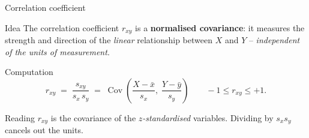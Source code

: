 \documentclass[aspectratio=169,11pt]{beamer}
\begin{document}
\begin{frame}{Correlation coefficient}
  \begin{block}{Idea}
    The correlation coefficient $r_{xy}$ is a
    \textbf{normalised covariance}: it measures the strength and
    direction of the \emph{linear} relationship between $X$ and $Y$
    -- \emph{independent of the units of measurement}.
  \end{block}

  \begin{block}{Computation}
    \[
      r_{xy} \;=\; \frac{s_{xy}}{s_x \, s_y}
             \;=\; \operatorname{Cov}\!\left(
                     \frac{X-\bar{x}}{s_x},\;
                     \frac{Y-\bar{y}}{s_y}
                   \right)
      \qquad -1 \le r_{xy} \le +1 .
    \]
  \end{block}

  \begin{exampleblock}{Reading}
    $r_{xy}$ is the covariance of the \emph{$z$-standardised} variables.
    Dividing by $s_x s_y$ cancels out the units.
  \end{exampleblock}
\end{frame}
\end{document}
